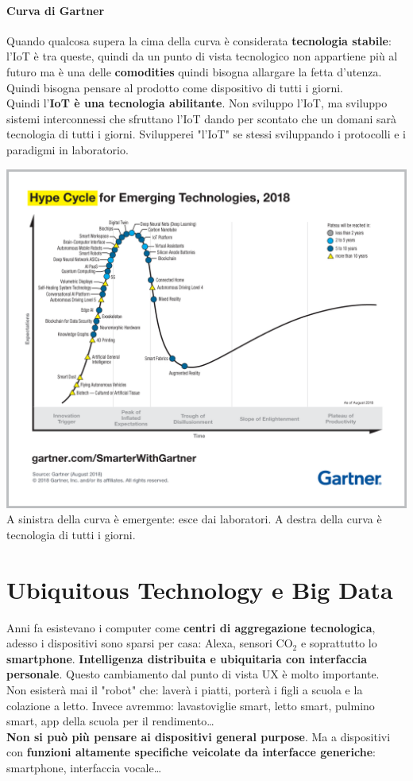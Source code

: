 \documentclass[10pt]{article}
\begin{document}
\paragraph{Curva di Gartner}
Quando qualcosa supera la cima della curva è considerata \textbf{tecnologia stabile}: l'IoT è tra queste, quindi da un punto di vista tecnologico non appartiene più al futuro ma è una delle \textbf{comodities} quindi bisogna allargare la fetta d'utenza. Quindi bisogna pensare al prodotto come dispositivo di tutti i giorni.\\
Quindi l'\textbf{IoT è una tecnologia abilitante}. Non sviluppo l'IoT, ma sviluppo sistemi interconnessi che sfruttano l'IoT dando per scontato che un domani sarà tecnologia di tutti i giorni. Svilupperei "l'IoT" se stessi sviluppando i protocolli e i paradigmi in laboratorio.
\begin{center}
\includegraphics[scale=0.22]{gartner2018.png}\\
A sinistra della curva è emergente: esce dai laboratori. A destra della curva è tecnologia di tutti i giorni.
\end{center}
\pagebreak
\section{Ubiquitous Technology e Big Data}
Anni fa esistevano i computer come \textbf{centri di aggregazione tecnologica}, adesso i dispositivi sono sparsi per casa: Alexa, sensori CO$_2$ e soprattutto lo \textbf{smartphone}. \textbf{Intelligenza distribuita e ubiquitaria con interfaccia personale}. Questo cambiamento dal punto di vista UX è molto importante.\\
Non esisterà mai il "robot" che: laverà i piatti, porterà i figli a scuola e la colazione a letto. Invece avremmo: lavastoviglie smart, letto smart, pulmino smart, app della scuola per il rendimento\ldots\\
\textbf{Non si può più pensare ai dispositivi general purpose}. Ma a dispositivi con \textbf{funzioni altamente specifiche veicolate da interfacce generiche}: smartphone, interfaccia vocale\ldots
\end{document}
